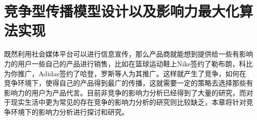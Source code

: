 

\chapter{竞争型传播模型设计以及影响力最大化算法实现}
\label{cha:4thChap04}
既然利用社会媒体平台可以进行信息宣传，那么产品商就能想到提供给一些有影响力的用户一些自己的产品进行销售，比如在篮球运动鞋上Nike签约了勒布朗，科比为你推广，Adidas签约了哈登，罗斯等人为其推广。这样就产生了竞争，如何在竞争环境下，使得自己的产品得到最广的传播，这就需要一定的策略去选择那些有影响力的用户为产品代言。目前非竞争的影响力分析已经得到了大量的研究，而对于现实生活中更为常见的存在竞争的影响力分析的研究则比较缺乏，本章将针对竞争环境下的影响力分析进行探讨和研究。



